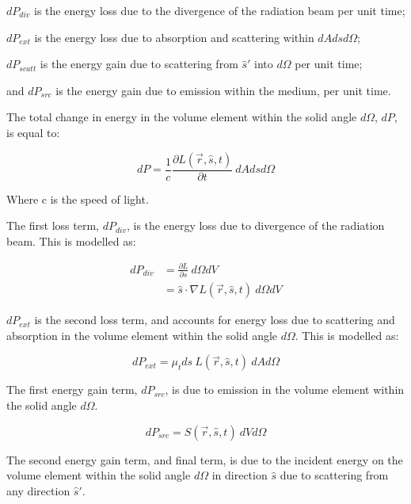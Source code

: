 \indent $dP_{div}$ is the energy loss due to the divergence of the radiation beam per unit time;

\indent $dP_{ext}$ is the energy loss due to absorption and scattering within $dAdsd\Omega$;

\indent $dP_{scatt}$ is the energy gain due to scattering from $\hat{s}'$ into $d\Omega$ per unit time;

\indent and $dP_{src}$ is the energy gain due to emission within the medium, per unit time.

\medskip

The total change in energy in the volume element within the solid angle $d\Omega$, $dP$, is equal to:

\begin{equation}
	dP=\frac{1}{c}\frac{\partial L(\vec{r},\hat{s},t)}{\partial t}\ dAdsd\Omega
	\label{eqn:p}
\end{equation}

\noindent Where c is the speed of light.

\medskip

The first loss term, $dP_{div}$, is the energy loss due to divergence of the radiation beam. This is modelled as:

\begin{align}
	dP_{div}&=\frac{\partial L}{\partial s}\ d\Omega dV \\
		    &=\hat{s} \cdot \nabla L(\vec{r},\hat{s},t)\ d\Omega dV
    \label{eqn:pdiv}
\end{align}

$dP_{ext}$ is the second loss term, and accounts for energy loss due to scattering and absorption in the volume element within the solid angle $d\Omega$. This is modelled as:

\begin{equation}
	dP_{ext}=\mu_t ds\ L(\vec{r},\hat{s},t)\ dAd\Omega
	\label{eqn:pext}
\end{equation}

The first energy gain term, $dP_{src}$, is due to emission in the volume element within the solid angle $d\Omega$. 

\begin{equation}
	dP_{src}=S(\vec{r},\hat{s},t)\ dVd\Omega
	\label{eqn:psrc}
\end{equation}

The second energy gain term, and final term, is due to the incident energy on the volume element within the solid angle $d\Omega$ in direction $\hat{s}$ due to scattering from any direction $\hat{s}'$.

